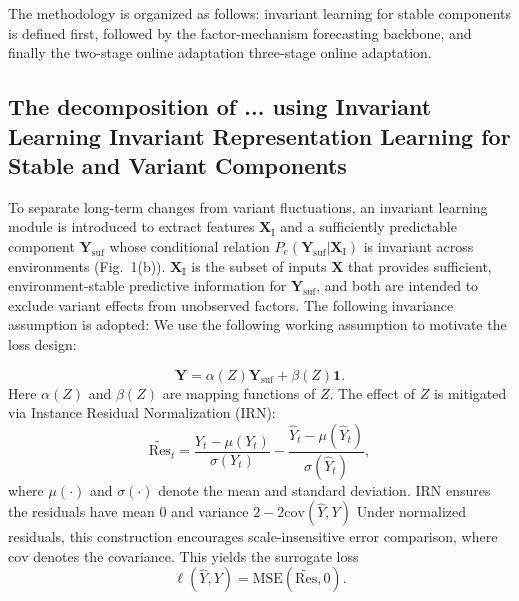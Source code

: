 ﻿\documentclass[journal]{IEEEtran}
\DeclareRobustCommand{\oldtext}[1]{{\color{revisionred}#1}}
\DeclareRobustCommand{\newtext}[1]{{\color{revisionblue}#1}}
\DeclareRobustCommand{\why}[1]{{\color{revisionblue}{\footnotesize (#1)}}}
\DeclareRobustCommand{\rw}[3]{\oldtext{#1} \newtext{#2}\why{#3}}
\begin{document}
The methodology is organized as follows: invariant learning for stable components is defined first, followed by the factor-mechanism forecasting backbone, and finally the \rw{two-stage online adaptation}{three-stage online adaptation}{全文实际使用 Stage I/II/III，应统一为三阶段。}.

\subsection{\rw{The decomposition of ... using Invariant Learning}{Invariant Representation Learning for Stable and Variant Components}{替换占位标题，明确本节内容。}}
To separate long-term changes from variant fluctuations, an invariant learning module is introduced to extract features $\mathbf{X}_{\mathrm{I}}$ and a sufficiently predictable component $\mathbf{Y}_{\mathrm{suf}}$ whose conditional relation $P_e(\mathbf{Y}_{\mathrm{suf}}|\mathbf{X}_{\mathrm{I}})$ is invariant across environments (Fig.~1(b)). $\mathbf{X}_{\mathrm{I}}$ is the subset of inputs $\mathbf{X}$ that provides sufficient, environment-stable predictive information for $\mathbf{Y}_{\mathrm{suf}}$, and both are intended to exclude variant effects from unobserved factors. \rw{The following invariance assumption is adopted:}{We use the following working assumption to motivate the loss design:}{降低未经证明的“assumption adopted”语气。}

\begin{equation}
\mathbf{Y}=\alpha(Z)\mathbf{Y}_{\mathrm{suf}}+\beta(Z) \mathbf{1}.
\end{equation}
Here $\alpha(Z)$ and $\beta(Z)$ are mapping functions of $Z$. The effect of $Z$ is mitigated via Instance Residual Normalization (IRN):
\begin{equation}
\tilde{\mathrm{Res}}_t=\frac{Y_t-\mu(Y_t)}{\sigma(Y_t)}-\frac{\widehat{Y}_t-\mu(\widehat{Y}_t)}{\sigma(\widehat{Y}_t)},
\end{equation}
where $\mu(\cdot)$ and $\sigma(\cdot)$ denote the mean and standard deviation. \rw{IRN ensures the residuals have mean 0 and variance $2-2\mathrm{cov}(\widehat{Y},Y)$}{Under normalized residuals, this construction encourages scale-insensitive error comparison}{原方差结论缺少完整推导和实现映射；改为保守描述。}, where $\mathrm{cov}$ denotes the covariance. This yields the surrogate loss
\begin{equation}
\ell(\widehat{Y},Y)=\mathrm{MSE}(\tilde{\mathrm{Res}},0).
\end{equation}
\end{document}
